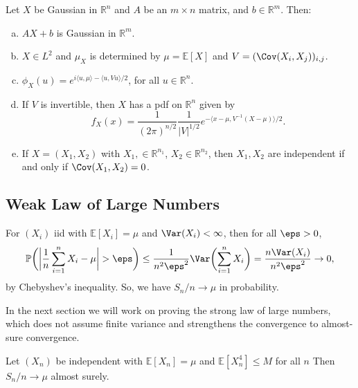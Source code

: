 \documentclass[12pt]{article}
\begin{document}
\begin{proposition}
	Let $X$ be Gaussian in $\mathbb{R}^n$ and $A$ be an $m \times n$ matrix, and $b \in \mathbb{R}^m$. Then:
	\begin{enumerate}[(a)]
		\item $AX + b$ is Gaussian in $\mathbb{R}^m$.
		\item $X \in L^2$ and $\mu_X$ is determined by $\mu = \mathbb{E}[X]$ and $V = (\Cov(X_i, X_j))_{i,j}$.
		\item $\phi_X(u) = e^{i\langle u, \mu\rangle - \langle u, Vu\rangle / 2}$, for all $u \in \mathbb{R}^n$.
		\item If $V$ is invertible, then $X$ has a pdf on $\mathbb{R}^n$ given by
			\[
			f_X(x) = \frac{1}{(2 \pi)^{n/2}} \frac{1}{|V|^{1/2}} e^{-\langle x - \mu, V^{-1}(X - \mu) \rangle / 2}.
			\]
		\item If $X = (X_1, X_2)$ with $X_1, \in \mathbb{R}^{n_1}$, $X_2 \in \mathbb{R}^{n_2}$, then $X_1, X_2$ are independent if and only if $\Cov(X_1, X_2) = 0$.
	\end{enumerate}
\end{proposition}

\subsection{Weak Law of Large Numbers}
\label{sub:wlln}

For $(X_i)$ iid with $\mathbb{E}[X_i] = \mu$ and $\Var(X_i) < \infty$, then for all $\eps > 0$,
\[
\mathbb{P} \biggl( \biggl| \frac{1}{n} \sum_{i = 1}^n X_i - \mu \biggr| > \eps \biggr) \leq \frac{1}{n^2 \eps^2} \Var \biggl( \sum_{i = 1}^n X_i \biggr) = \frac{n \Var(X_i)}{n^2 \eps^2} \to 0,
\]
by Chebyshev's inequality. So, we have $S_n/n \to \mu$ in probability.

In the next section we will work on proving the strong law of large numbers, which does not assume finite variance and strengthens the convergence to almost-sure convergence.


\begin{proposition}
	Let $(X_n)$ be independent with $\mathbb{E}[X_n] = \mu$ and $\mathbb{E}[X_n^4] \leq M$ for all $n$ Then $S_n/n \to \mu$ almost surely.
\end{proposition}
\end{document}
